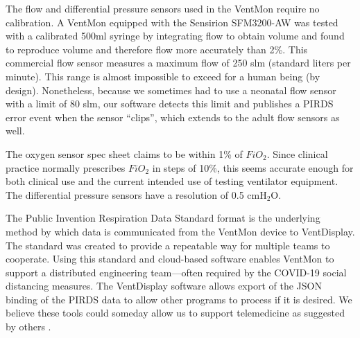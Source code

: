 \documentclass[11pt, letterpaper]{article}
\begin{document}
The flow and differential pressure sensors used in the VentMon require no calibration. A VentMon equipped with the Sensirion SFM3200-AW was tested with a calibrated 500ml syringe by integrating flow to obtain volume and found to reproduce volume and therefore flow more accurately than 2\%. This commercial flow sensor measures a maximum flow of 250 slm (standard liters per minute). This range is almost impossible to exceed for a human being (by design). Nonetheless, because we sometimes had to use a neonatal flow sensor with a limit of 80 slm, our software detects this limit and publishes a PIRDS error event when the sensor ``clips'', which extends to the adult flow sensors as well.

The oxygen sensor spec sheet claims to be within 1\% of  $FiO_2$. Since clinical practice normally prescribes $FiO_2$ in steps of 10\%, this seems accurate enough for both clinical use and
the current intended use of testing ventilator equipment. The differential pressure sensors have a resolution of 0.5 cmH$_2$O.

The Public Invention Respiration Data Standard format \cite{PIRDS} is the underlying method by which data is communicated from the VentMon device to VentDisplay. The standard was created to provide a repeatable way for multiple teams to cooperate. Using this standard and cloud-based software enables VentMon to support a distributed engineering team---often required by the COVID-19 social distancing measures. The VentDisplay software allows export of the JSON binding of the PIRDS data to allow other programs to process if it is desired. We believe these tools could someday allow us to support telemedicine as suggested by others \cite{rehm2018development}.
\end{document}

